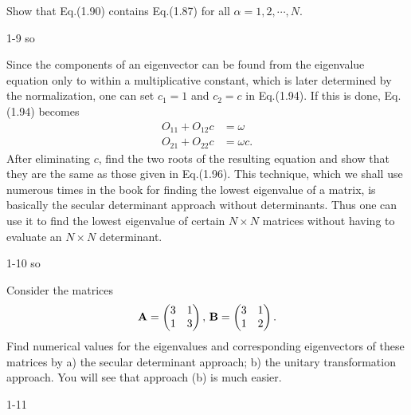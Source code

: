 \documentclass[a4paper]{book}
\newcommand{\A}{{\bf A}}
\newcommand{\B}{{\bf B}}
\begin{document}
	\begin{exercise}
		Show that Eq.(1.90) contains Eq.(1.87) for all $\alpha=1,2,\cdots,N$.
	\end{exercise}
	
	\begin{solution}
		1-9 so
	\end{solution}
	
	\begin{exercise}
	Since the components of an eigenvector can be found from the eigenvalue equation only to within a multiplicative constant, which is later determined by the normalization, one can set $c_1 = 1$ and $c_2 = c$ in Eq.(1.94). If this is done, Eq.(1.94) becomes
	\begin{align*}
		O_{11} + O_{12} c &= \omega \\
		O_{21} + O_{22} c &= \omega c. 
	\end{align*}
	After eliminating $c$, find the two roots of the resulting equation and show that they are the same as those given in Eq.(1.96). This technique, which we shall use numerous times in the book for finding the lowest eigenvalue of a matrix, is basically the secular determinant approach without determinants. Thus one can use it to find the lowest eigenvalue of certain $N \times N$ matrices without having to evaluate an $N \times N$ determinant.
	\end{exercise}
	
	\begin{solution}
		1-10 so
	\end{solution}
	
	\begin{exercise}
	Consider the matrices
	\begin{equation*}
		\A = \begin{pmatrix} 3 & 1 \\ 1 & 3 \end{pmatrix}, \,  \B = \begin{pmatrix} 3 & 1 \\ 1 & 2 \end{pmatrix}.
	\end{equation*}
	Find numerical values for the eigenvalues and corresponding eigenvectors of these matrices by a) the secular determinant approach; b) the unitary transformation approach. You will see that approach (b) is much easier.
	\end{exercise}
	
	\begin{solution}
		1-11
	\end{solution}
\end{document}

